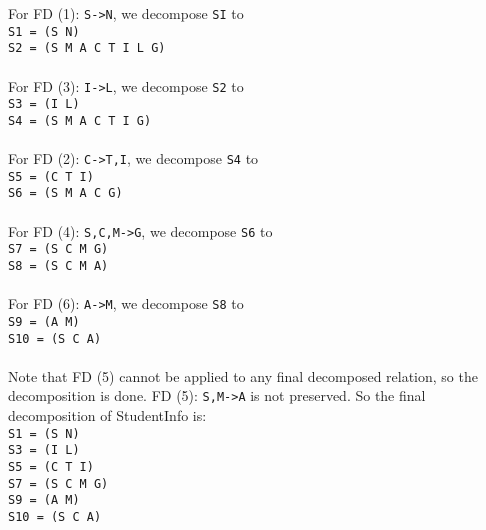 \documentclass{article}
\begin{document}
For FD (1): \texttt{S->N}, we decompose \texttt{SI} to\\
\texttt{S1 = (S N)} \\
\texttt{S2 = (S M A C T I L G)} \\
\\
For FD (3): \texttt{I->L}, we decompose \texttt{S2} to\\
\texttt{S3 = (I L)} \\
\texttt{S4 = (S M A C T I G)} \\
\\
For FD (2): \texttt{C->T,I}, we decompose \texttt{S4} to \\
\texttt{S5 = (C T I)} \\
\texttt{S6 = (S M A C G)} \\
\\
For FD (4): \texttt{S,C,M->G}, we decompose \texttt{S6} to \\
\texttt{S7 = (S C M G)} \\
\texttt{S8 = (S C M A)} \\
\\
For FD (6): \texttt{A->M}, we decompose \texttt{S8} to \\
\texttt{S9 = (A M)} \\
\texttt{S10 = (S C A)}\\
\\
Note that FD (5) cannot be applied to any final decomposed relation, so the decomposition is done. FD (5): \texttt{S,M->A} is not preserved. So the final decomposition of StudentInfo is:\\
\texttt{S1 = (S N)} \\
\texttt{S3 = (I L)} \\
\texttt{S5 = (C T I)} \\
\texttt{S7 = (S C M G)} \\
\texttt{S9 = (A M)} \\
\texttt{S10 = (S C A)}\\
\end{document}
